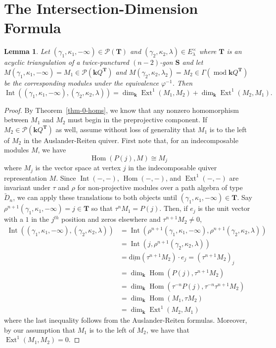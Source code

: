 \documentclass[11pt]{amsart}
\theoremstyle{plain}
\newtheorem{lemma}[theorem]{Lemma}
\theoremstyle{definition}
\numberwithin{equation}{section}
\def\surf{\mathbf{S}}                       %
\def\TT{\mathbf{T}}
\renewcommand{\k}{\mathbf{k}}
\renewcommand{\mod}{\operatorname{mod}}
\newcommand{\Int}{\operatorname{Int}}
\newcommand{\Hom}{\operatorname{Hom}}
\newcommand{\Ext}{\operatorname{Ext}}
\newcommand{\udim}{\operatorname{\underline{dim}}}
\begin{document}
\section{The Intersection-Dimension Formula}

\begin{lemma}
    Let $(\gamma_1, \kappa_1, -\infty) \in \mathcal{P}(\TT)$ and $(\gamma_2, \kappa_2, \lambda) \in E^\times_\lambda$ where $\TT$ is an acyclic triangulation of a twice-punctured $(n-2)$-gon $\surf$ and let $M(\gamma_1, \kappa_1, -\infty) = M_1 \in \mathcal{P}(\k Q^\TT)$ and $M(\gamma_2, \kappa_2, \lambda_2) = M_2 \in \Gamma(\mod \k Q^\TT)$ be the corresponding modules under the equivalence $\varphi^{-1}$.
    Then $$\Int( (\gamma_1,\kappa_1, -\infty), (\gamma_2,\kappa_2, \lambda) ) = \dim_\k \Ext^1 (M_1, M_2) + \dim_\k \Ext^1 (M_2, M_1).$$
\end{lemma}

\begin{proof}
    By Theorem~\ref{thm-0-homs}, we know that any nonzero homomorphism between $M_1$ and $M_2$ must begin in the preprojective component.
    If $M_2 \in \mathcal{P}(\k Q^\TT)$ as well, assume without loss of generality that $M_1$ is to the left of $M_2$ in the Auslander-Reiten quiver.
    First note that, for an indecomposable modules $M$, we have \[\Hom (P(j), M) \cong M_j\] where $M_j$ is the vector space at vertex $j$ in the indecomposable quiver representation $M$.
    Since $\Int( -, - )$, $\Hom(-,-)$, and $\Ext^1 (-, -)$ are invariant under $\tau$ and $\rho$ for non-projective modules over a path algebra of type $\widetilde{D}_n$, we can apply these translations to both objects until $(\gamma_1, \kappa_1, -\infty) \in \TT$.
    Say $\rho^{n+1} (\gamma_1,\kappa_1, -\infty) = j \in \TT$ so that $\tau^{n} M_1 = P(j)$.
    Then, if $e_j$ is the unit vector with a $1$ in the $j^{th}$ position and zeros elsewhere and $\tau^{n+1} M_2 \neq 0$,
    \begin{align*}
        \Int( (\gamma_1,\kappa_1, -\infty), (\gamma_2,\kappa_2, \lambda) ) &= \Int( \rho^{n+1}(\gamma_1,\kappa_1, -\infty), \rho^{n+1}(\gamma_2,\kappa_2, \lambda) ) \\
        &= \Int( j, \rho^{n+1}(\gamma_2,\kappa_2, \lambda) ) \\
        &= \udim (\tau^{n+1} M_2) \cdot e_j = (\tau^{n+1} M_2)_j \\
        &= \dim_\k \Hom (P(j), \tau^{n+1} M_2) \\
        &= \dim_\k \Hom (\tau^{-n}P(j), \tau^{-n}\tau^{n+1} M_2) \\
        &= \dim_\k \Hom (M_1, \tau M_2) \\
        &= \dim_\k \Ext^1 (M_2, M_1)
    \end{align*}
    where the last inequality follows from the Auslander-Reiten formulas.
    Moreover, by our assumption that $M_1$ is to the left of $M_2$, we have that $\Ext^1 (M_1, M_2) = 0$.
\end{proof}
\end{document}
